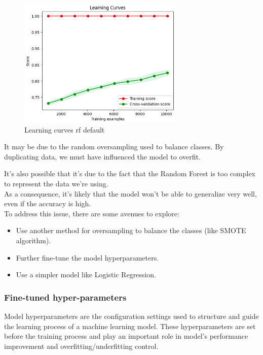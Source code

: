 \documentclass[a4paper,12pt]{article}
\begin{document}
\begin{figure}[H]
  \centering
  \includegraphics[width=0.7\textwidth]{./images/lc_rf_default.png}
  \caption{Learning curves rf default}
  \label{fig:lc_rf_default}
\end{figure}

It may be due to the random oversampling used to balance classes. By duplicating data, we must have influenced the model to overfit. 

It's also possible that it's due to the fact that the Random Forest is too complex to represent the data we're using.\\
  
As a consequence, it's likely that the model won't be able to generalize very well, even if the accuracy is high.\\ 
To address this issue, there are some avenues to explore:
\begin{itemize}
    \item Use another method for oversampling to balance the classes (like SMOTE algorithm).
    \item Further fine-tune the model hyperparameters.
    \item Use a simpler model like Logistic Regression.
\end{itemize}




\subsubsection{Fine-tuned hyper-parameters}


Model hyperparameters are the configuration settings used to structure and guide the learning process of a machine learning model. These hyperparameters are set before the training process and play an important role in model's performance improvement and overfitting/underfitting control.\\
\end{document}

